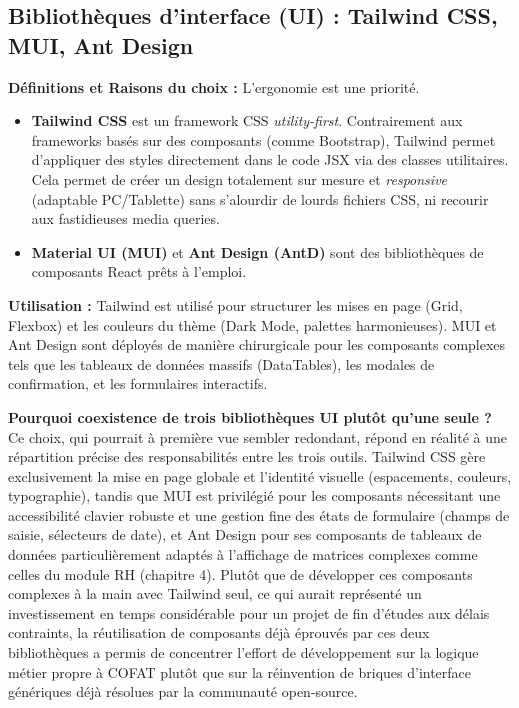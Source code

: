 \subsection{Bibliothèques d'interface (UI) : Tailwind CSS, MUI, Ant Design}
\textbf{Définitions et Raisons du choix :} L'ergonomie est une priorité. 
\begin{itemize}
    \item \textbf{Tailwind CSS} est un framework CSS \textit{utility-first}. Contrairement aux frameworks basés sur des composants (comme Bootstrap), Tailwind permet d'appliquer des styles directement dans le code JSX via des classes utilitaires. Cela permet de créer un design totalement sur mesure et \textit{responsive} (adaptable PC/Tablette) sans s'alourdir de lourds fichiers CSS, ni recourir aux fastidieuses media queries.
    \item \textbf{Material UI (MUI)} et \textbf{Ant Design (AntD)} sont des bibliothèques de composants React prêts à l'emploi. 
\end{itemize}
\textbf{Utilisation :} Tailwind est utilisé pour structurer les mises en page (Grid, Flexbox) et les couleurs du thème (Dark Mode, palettes harmonieuses). MUI et Ant Design sont déployés de manière chirurgicale pour les composants complexes tels que les tableaux de données massifs (DataTables), les modales de confirmation, et les formulaires interactifs.

\textbf{Pourquoi coexistence de trois bibliothèques UI plutôt qu'une seule ?} Ce choix, qui pourrait à première vue sembler redondant, répond en réalité à une répartition précise des responsabilités entre les trois outils. Tailwind CSS gère exclusivement la mise en page globale et l'identité visuelle (espacements, couleurs, typographie), tandis que MUI est privilégié pour les composants nécessitant une accessibilité clavier robuste et une gestion fine des états de formulaire (champs de saisie, sélecteurs de date), et Ant Design pour ses composants de tableaux de données particulièrement adaptés à l'affichage de matrices complexes comme celles du module RH (chapitre 4). Plutôt que de développer ces composants complexes à la main avec Tailwind seul, ce qui aurait représenté un investissement en temps considérable pour un projet de fin d'études aux délais contraints, la réutilisation de composants déjà éprouvés par ces deux bibliothèques a permis de concentrer l'effort de développement sur la logique métier propre à COFAT plutôt que sur la réinvention de briques d'interface génériques déjà résolues par la communauté open-source.


